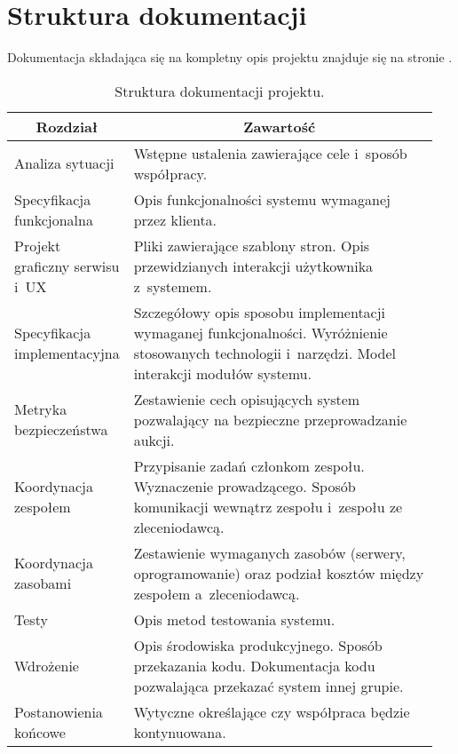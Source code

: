 \documentclass[10pt,a4paper]{article}
\begin{document}
\section{Struktura dokumentacji}
Dokumentacja składająca się na kompletny opis projektu znajduje się na stronie
\pageref{tab:struktura_dokumentacji}.
\begin{table}[p]
  \centering
  \begin{tabular}{p{0.2\linewidth} p{0.75\linewidth}}
    \toprule
    \multicolumn{1}{c}{\bf Rozdział} & \multicolumn{1}{c}{\bf Zawartość} \\
    \midrule
    Analiza sytuacji &
    Wstępne ustalenia zawierające cele i~sposób współpracy. \\
    \midrule
    Specyfikacja funkcjonalna &
    Opis funkcjonalności systemu wymaganej przez klienta. \\
    \midrule
    Projekt graficzny serwisu i~UX &
    Pliki zawierające szablony stron. Opis przewidzianych interakcji
    użytkownika z~systemem. \\
    \midrule
    Specyfikacja implementacyjna &
    Szczegółowy opis sposobu implementacji wymaganej funkcjonalności.
    Wyróżnienie stosowanych technologii i~narzędzi. Model interakcji modułów
    systemu. \\
    \midrule
    Metryka bezpieczeństwa &
    Zestawienie cech opisujących system pozwalający na bezpieczne
    przeprowadzanie aukcji. \\
    \midrule
    Koordynacja zespołem &
    Przypisanie zadań członkom zespołu. Wyznaczenie prowadzącego. Sposób
    komunikacji wewnątrz zespołu i~zespołu ze zleceniodawcą. \\
    \midrule
    Koordynacja zasobami &
    Zestawienie wymaganych zasobów (serwery, oprogramowanie) oraz podział
    kosztów między zespołem a~zleceniodawcą. \\
    \midrule
    Testy &
    Opis metod testowania systemu. \\
    \midrule
    Wdrożenie &
    Opis środowiska produkcyjnego. Sposób przekazania kodu. Dokumentacja kodu
    pozwalająca przekazać system innej grupie. \\
    \midrule
    Postanowienia końcowe &
    Wytyczne określające czy współpraca będzie kontynuowana. \\
    \bottomrule
  \end{tabular}
  \label{tab:struktura_dokumentacji}
  \caption{Struktura dokumentacji projektu.}
\end{table}
\end{document}

